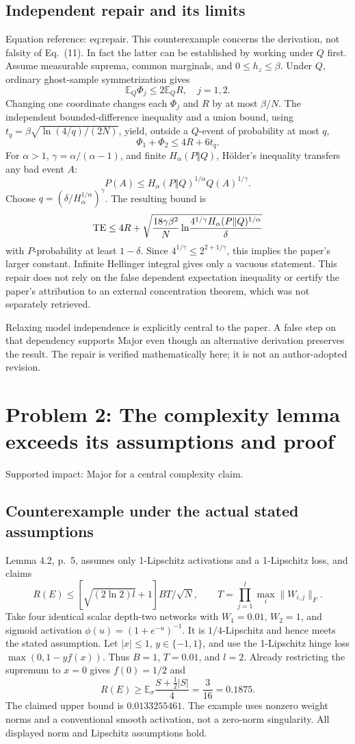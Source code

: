 \documentclass[10pt]{article}
\begin{document}
\subsection*{Independent repair and its limits}
Equation reference: eq:repair. This counterexample concerns the derivation, not falsity of Eq. (11). In fact the latter can be established by working under \(Q\) first. Assume measurable suprema, common marginals, and \(0\le h_z\le\beta\). Under \(Q\), ordinary ghost-sample symmetrization gives \[\mathbb E_Q\Phi_j\le2\mathbb E_QR,\quad j=1,2.\] Changing one coordinate changes each \(\Phi_j\) and \(R\) by at most \(\beta/N\). The independent bounded-difference inequality and a union bound, using \(t_q=\beta\sqrt{\ln(4/q)/(2N)}\), yield, outside a \(Q\)-event of probability at most \(q\), \[\Phi_1+\Phi_2\le4R+6t_q.\] For \(\alpha>1\), \(\gamma=\alpha/(\alpha-1)\), and finite \(H_\alpha(P\Vert Q)\), Hölder’s inequality transfers any bad event \(A\): \[P(A)\le H_\alpha(P\Vert Q)^{1/\alpha}Q(A)^{1/\gamma}.\] Choose \(q=(\delta/H_\alpha^{1/\alpha})^\gamma\). The resulting bound is \[{\rm TE}\le4R+
 \sqrt{\frac{18\gamma\beta^2}{N}
 \ln\!\frac{4^{1/\gamma}H_\alpha(P\Vert Q)^{1/\alpha}}{\delta}}
 \] with \(P\)-probability at least \(1-\delta\). Since \(4^{1/\gamma}\le2^{2+1/\gamma}\), this implies the paper’s larger constant. Infinite Hellinger integral gives only a vacuous statement. This repair does not rely on the false dependent expectation inequality or certify the paper’s attribution to an external concentration theorem, which was not separately retrieved.\par
Relaxing model independence is explicitly central to the paper. A false step on that dependency supports Major even though an alternative derivation preserves the result. The repair is verified mathematically here; it is not an author-adopted revision.\par
\section*{Problem 2: The complexity lemma exceeds its assumptions and proof}
Supported impact: Major for a central complexity claim.\par
\subsection*{Counterexample under the actual stated assumptions}
Lemma 4.2, p. 5, assumes only 1-Lipschitz activations and a 1-Lipschitz loss, and claims \[R(E)\le [\sqrt{(2\ln2)l}+1]BT/\sqrt N,\qquad
 T=\prod_{j=1}^l\max_i\|W_{i,j}\|_F.\] Take four identical scalar depth-two networks with \(W_1=0.01\), \(W_2=1\), and sigmoid activation \(\phi(u)=(1+e^{-u})^{-1}\). It is \(1/4\)-Lipschitz and hence meets the stated assumption. Let \(|x|\le1\), \(y\in\{-1,1\}\), and use the 1-Lipschitz hinge loss \(\max(0,1-yf(x))\). Thus \(B=1\), \(T=0.01\), and \(l=2\). Already restricting the supremum to \(x=0\) gives \(f(0)=1/2\) and \[R(E)\ge \mathbb E_\sigma\frac{S+\tfrac12|S|}{4}
 =\frac3{16}=0.1875.\] The claimed upper bound is \(0.0133255461\). The example uses nonzero weight norms and a conventional smooth activation, not a zero-norm singularity. All displayed norm and Lipschitz assumptions hold.\par
\end{document}

